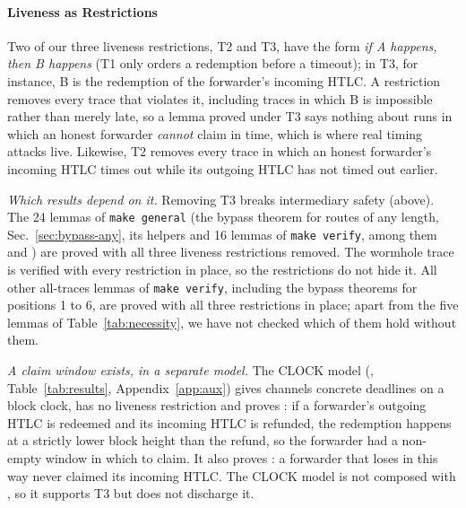 \label{par:liveness-scope}%
\paragraph{Liveness as Restrictions}
Two of our three liveness restrictions, T2 and T3, have the form
\emph{if A happens, then B happens} (T1 only orders a redemption before a timeout); in T3, for
instance, B is the redemption of the forwarder's incoming HTLC. A restriction removes every
trace that violates it, including traces in which B is impossible rather than merely late, so a
lemma proved under T3 says nothing about runs in which an honest forwarder \emph{cannot} claim
in time, which is where real timing attacks live. Likewise, T2 removes every trace in which an
honest forwarder's incoming HTLC times out while its outgoing HTLC has not timed out earlier.

\emph{Which results depend on it.} Removing T3 breaks intermediary safety (above). The 24
lemmas of \texttt{make general} (the bypass theorem for routes of any length,
Sec.~\ref{sec:bypass-any}, its helpers and 16 lemmas of \texttt{make verify}, among them
 and ) are proved with all three
liveness restrictions removed. The wormhole trace  is
verified with every restriction in place, so the restrictions do not hide it. All other all-traces lemmas of \texttt{make verify},
including the bypass theorems for positions 1 to 6, are proved with all three restrictions in
place; apart from the five lemmas of Table~\ref{tab:necessity}, we have not checked which of
them hold without them.

\emph{A claim window exists, in a separate model.} The CLOCK model (,
Table~\ref{tab:results}, Appendix~\ref{app:aux}) gives channels concrete deadlines on a block
clock, has no liveness restriction and proves : if a forwarder's
outgoing HTLC is redeemed and its incoming HTLC is refunded, the redemption happens at a
strictly lower block height than the refund, so the forwarder had a non-empty window in which
to claim. It also proves
: a forwarder that loses in this way never claimed its incoming
HTLC. The CLOCK model is not composed with , so it supports T3 but does
not discharge it.

